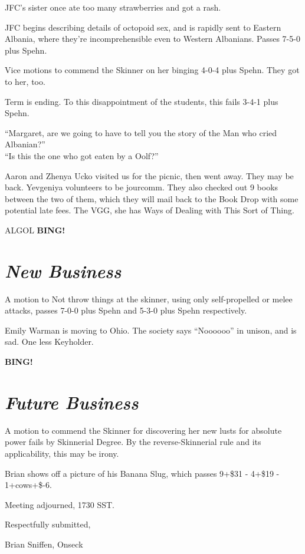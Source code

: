 \documentclass[10pt]{article}
\newcommand{\bing}{{\bf BING!} }
\newcommand{\goto}[1]{\bing \vskip 12pt \section*{{\em{#1}}}}
\newcommand{\ps}{ plus Spehn\xspace}
\begin{document}
JFC's sister once ate too many strawberries and got a rash.

JFC begins describing details of octopoid sex, and is rapidly sent to
Eastern Albania, where they're incomprehensible even to Western
Albanians.  Passes 7-5-0\ps.

Vice motions to commend the Skinner on her binging 4-0-4\ps.  They got
to her, too.

Term is ending.  To this disappointment of the students, this fails
3-4-1\ps.

``Margaret, are we going to have to tell you the story of the Man who
cried Albanian?''\\
``Is this the one who got eaten by a Oolf?''

Aaron and Zhenya Ucko visited us for the picnic, then went away.  They
may be back.  Yevgeniya volunteers to be jourcomm.  They also checked
out 9 books between the two of them, which they will mail back to the
Book Drop with some potential late fees.  The VGG, she has Ways of
Dealing with This Sort of Thing.

ALGOL
\goto{New Business}
A motion to Not throw things at the skinner, using only self-propelled
or melee attacks, passes 7-0-0\ps and 5-3-0\ps respectively.

Emily Warman is moving to Ohio.  The society says ``Noooooo'' in
unison, and is sad.  One less Keyholder.

\goto{Future Business}
A motion to commend the Skinner for discovering her new lusts for
absolute power fails by Skinnerial Degree.  By the reverse-Skinnerial
rule and its applicability, this may be irony.

Brian shows off a picture of his Banana Slug, which passes 9+\$31 -
4+\$19 - 1+cows+\$-6.

\vspace{12pt}

\noindent
Meeting adjourned, 1730 SST.

\vspace{18pt}

\centerline{Respectfully submitted,}
\centerline{Brian Sniffen,  Onseck}
\end{document}
